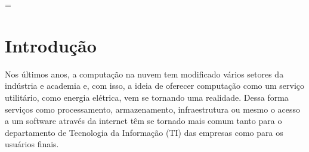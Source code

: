 \documentclass[a4paper,titlepage,12pt]{article}
\begin{document}
\newpage
\cleardoublepage


\pagestyle{plain}


\setcounter{page}{2}
\printnomenclature[1cm]

\newpage
\listoffigures

\vspace{3cm}

\listoftables
\newpage

\tableofcontents
\newpage


\pagestyle{plain}

\pagestyle{fancy}
\addtolength{\headwidth}{\marginparsep}\addtolength{\headwidth}{\marginparwidth}\headwidth
= \textwidth
\renewcommand{\sectionmark}[1]{\markright{\thesection\ #1}}\lhead[\fancyplain{}{\bfseries\thepage}]%
{\fancyplain{}{\emph{\rightmark}}}\rhead[\fancyplain{}{\bfseries\leftmark}]%
{\fancyplain{}{\bfseries\thepage}}\cfoot{}



\setcounter{page}{5}
\section{Introdução}
\label{sec:introducao}

Nos últimos anos, a computação na nuvem tem modificado vários setores da indústria e academia e, com isso, a ideia de oferecer computação como um serviço utilitário, como energia elétrica, vem se tornando uma realidade. Dessa forma serviços como processamento, armazenamento, infraestrutura ou mesmo o acesso a um software através da internet têm se tornado mais comum tanto para o departamento de Tecnologia da Informação (TI) das empresas como para os usuários finais. 
\end{document}
